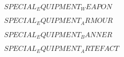 
\raggedcolumns
\begin{multicols}{2}
\subtitle{\weaponenchantments}

    $SPECIAL_EQUIPMENT_WEAPON$

	\subtitle{\armourenchantments}
    $SPECIAL_EQUIPMENT_ARMOUR$

    \subtitle{\bannerenchantments}
    $SPECIAL_EQUIPMENT_BANNER$

    \subtitle{\artefacts}
    $SPECIAL_EQUIPMENT_ARTEFACT$

\end{multicols}


